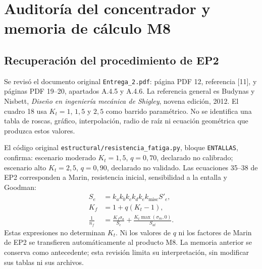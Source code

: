 \section{Auditoría del concentrador y memoria de cálculo M8}
\label{anexo:Kt_M8}
\subsection{Recuperación del procedimiento de EP2}
Se revisó el documento original \texttt{Entrega\_2.pdf}: página PDF 12,
referencia [11], y páginas PDF 19--20, apartados A.4.5 y A.4.6.
La referencia general es Budynas y Nisbett, \emph{Diseño en ingeniería
mecánica de Shigley}, novena edición, 2012. El cuadro 18 usa
$K_t=1$, $1,5$ y $2,5$ como barrido paramétrico. No se identifica
una tabla de roscas, gráfico, interpolación, radio de raíz ni ecuación
geométrica que produzca estos valores\cite{ep2_auditoria_Kt}.

El código original \texttt{estructural/resistencia\_fatiga.py}, bloque
\texttt{ENTALLAS}, confirma: escenario moderado $K_t=1,5$, $q=0,70$,
declarado no calibrado; escenario alto $K_t=2,5$, $q=0,90$, declarado
no validado. Las ecuaciones 35--38 de EP2 corresponden a Marin,
resistencia inicial, sensibilidad a la entalla y Goodman:
\begin{align}
 S_e&=k_a k_b k_c k_d k_e k_{\mathrm{misc}} S'_e,\\
 K_f&=1+q(K_t-1),\\
 \frac{1}{n_f}&=\frac{K_f\sigma_a}{S_e}
 +\frac{K_t\max(\sigma_m,0)}{S_{ut}}.
\end{align}
Estas expresiones no determinan $K_t$. Ni los valores de $q$ ni los
factores de Marin de EP2 se transfieren automáticamente al producto M8.
La memoria anterior se conserva como antecedente; esta revisión limita
su interpretación, sin modificar sus tablas ni sus archivos.

